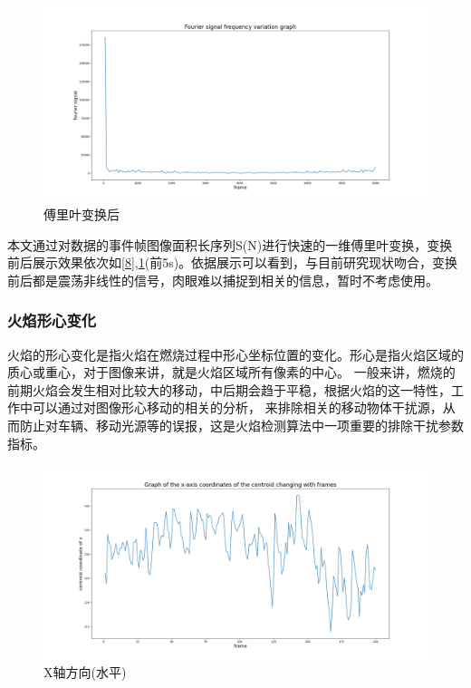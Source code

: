 \begin{figure}[ht]
    \centering
    \includegraphics[width=\textwidth]{figures/extract_flicker_02.png}
    \caption{傅里叶变换后}
    \label{9}
\end{figure}

本文通过对数据的事件帧图像面积长序列S(N)进行快速的一维傅里叶变换，变换前后展示效果依次如\ref{8},\ref{9}(前5s)。依据展示可以看到，与目前研究现状吻合，变换前后都是震荡非线性的信号，肉眼难以捕捉到相关的信息，暂时不考虑使用。

\subsubsection{火焰形心变化}
火焰的形心变化是指火焰在燃烧过程中形心坐标位置的变化。形心是指火焰区域的质心或重心，对于图像来讲，就是火焰区域所有像素的中心。
一般来讲，燃烧的前期火焰会发生相对比较大的移动，中后期会趋于平稳，根据火焰的这一特性，工作中可以通过对图像形心移动的相关的分析，
来排除相关的移动物体干扰源，从而防止对车辆、移动光源等的误报，这是火焰检测算法中一项重要的排除干扰参数指标。

\begin{figure}[ht]
    \centering
    \includegraphics[width=\textwidth]{figures/extract_centroid_x.png}
    \caption{X轴方向(水平)}
    \label{10}
    \end{figure}

